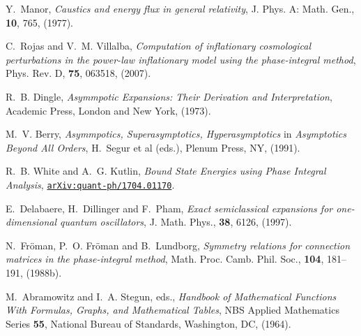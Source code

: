 \documentclass[atmp]{ipart_v1}
\begin{document}
\begin{thebibliography}{30}
 Y.~Manor, 
\textit{Caustics and energy flux in general relativity},
J. Phys. A: Math. Gen., \textbf{10}, 765, (1977).

 C.~Rojas and V.~M. Villalba, 
\textit{Computation of inflationary cosmological perturbations 
in the power-law inflationary model using the phase-integral method},
Phys. Rev. D, \textbf{75}, 063518, (2007).

 R.~B. Dingle, 
\textit{Asymmpotic Expansions: Their Derivation and Interpretation}, 
Academic Press, London and New York, (1973).

 M.~V. Berry, 
\textit{Asymmpotics, Superasymptotics, Hyperasymptotics} in 
\textit{Asymptotics Beyond All Orders}, 
H.~Segur et al (eds.), Plenum Press, NY, (1991).

 R.~B. White and A.~G. Kutlin, 
\textit{Bound State Energies using Phase Integral Analysis},
\href{https://arxiv.org/abs/1704.01170}{{\tt arXiv:quant-ph/1704.01170}}.

 E.~Delabaere, H.~Dillinger and F.~Pham, 
\textit{Exact semiclassical expansions for one-dimensional quantum oscillators},
J. Math. Phys., \textbf{38}, 6126, (1997).

 N.~Fr\"oman, P.~O. Fr\"oman and B.~Lundborg,
\textit{Symmetry relations for connection matrices in the phase-integral method}, 
Math. Proc. Camb. Phil. Soc., \textbf{104}, 181–191, (1988b).

 M.~Abramowitz and I.~A. Stegun, eds., 
\textit{Handbook of Mathematical Functions With Formulas, Graphs, and Mathematical Tables}, 
NBS Applied Mathematics Series \textbf{55}, National Bureau of Standards, Washington, DC, (1964).

\end{thebibliography}

\address{Institute of Applied Physics of Russian Academy of Sciences, \\ 
46 Ulyanov str., 603950 Nizhny Novgorod, Russia\\
}
\end{document}
